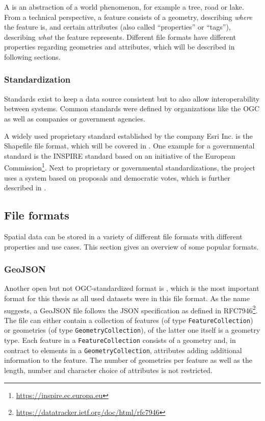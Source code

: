 			A  is an abstraction of a world phenomenon, for example a tree, road or lake.
			From a technical perspective, a feature consists of a geometry, describing \textit{where} the feature is, and certain attributes (also called \enquote{properties} or \enquote{tags}), describing \textit{what} the feature represents.
			Different file formats have different properties regarding geometries and attributes, which will be described in following sections.
		
		\subsubsection{Standardization}
		
			Standards exist to keep a data source consistent but to also allow interoperability between systems.
			Common standards were defined by organizations like the OGC as well as companies or government agencies.
			
			A widely used proprietary standard established by the company Esri Inc. is the Shapefile file format, which will be covered in .
			One example for a governmental standard is the INSPIRE standard based on an initiative of the European Commission\footnote{\url{https://inspire.ec.europa.eu}}.
			Next to proprietary or governmental standardizations, the  project uses a system based on proposals and democratic votes, which is further described in .
			
	\subsection{File formats}
	\label{subsec:file-formats}
	
		Spatial data can be stored in a variety of different file formats with different properties and use cases.
		This section gives an overview of some popular formats.
		
		\subsubsection{GeoJSON}
		\label{subsubsec:geojson}
		
			Another open but not OGC-standardized format is , which is the most important format for this thesis as all used datasets were in this file format.
			As the name suggests, a GeoJSON file follows the JSON specification as defined in RFC7946\footnote{\url{https://datatracker.ietf.org/doc/html/rfc7946}}.
			The file can either contain a collection of features (of type \texttt{FeatureCollection}) or geometries (of type \texttt{GeometryCollection}), of the latter one itself is a geometry type.
			Each feature in a \texttt{FeatureCollection} consists of a geometry and, in contract to elements in a \texttt{GeometryCollection}, attributes adding additional information to the feature.
			The number of geometries per feature as well as the length, number and character choice of attributes is not restricted.
			
